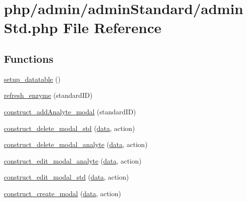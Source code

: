 \hypertarget{admin_std_8php}{\section{php/admin/admin\-Standard/admin\-Std.php File Reference}
\label{admin_std_8php}
}
\subsection*{Functions}
\begin{DoxyCompactItemize}
\item 
\hyperlink{admin_std_8php_a9ff77c8de996b53098750f48827c9790}{setup\-\_\-datatable} ()
\item 
\hyperlink{admin_std_8php_aabe3eddd8b025de2d63daa48fced5407}{refresh\-\_\-enzyme} (standard\-I\-D)
\item 
\hyperlink{admin_std_8php_af612a5722d436678a22f7a2e6b6e9cc6}{construct\-\_\-add\-Analyte\-\_\-modal} (standard\-I\-D)
\item 
\hyperlink{admin_std_8php_a0b069c5aaabb70f5aa56f03436ec3b62}{construct\-\_\-delete\-\_\-modal\-\_\-std} (\hyperlink{chart1_8php_ab3ed669f4b3fdb8c88f3a190fb907de0}{data}, action)
\item 
\hyperlink{admin_std_8php_a731f8acb00c0ded5d82180e66261df2f}{construct\-\_\-delete\-\_\-modal\-\_\-analyte} (\hyperlink{chart1_8php_ab3ed669f4b3fdb8c88f3a190fb907de0}{data}, action)
\item 
\hyperlink{admin_std_8php_a6c7a02b3ba9cc81ddfe5c61c13ac056f}{construct\-\_\-edit\-\_\-modal\-\_\-analyte} (\hyperlink{chart1_8php_ab3ed669f4b3fdb8c88f3a190fb907de0}{data}, action)
\item 
\hyperlink{admin_std_8php_a203cc17bc013b004954fcb8d2c444b02}{construct\-\_\-edit\-\_\-modal\-\_\-std} (\hyperlink{chart1_8php_ab3ed669f4b3fdb8c88f3a190fb907de0}{data}, action)
\item 
\hyperlink{admin_std_8php_a819348e44d419a2bdfe60b344c56e031}{construct\-\_\-create\-\_\-modal} (\hyperlink{chart1_8php_ab3ed669f4b3fdb8c88f3a190fb907de0}{data}, action)
\end{DoxyCompactItemize}


